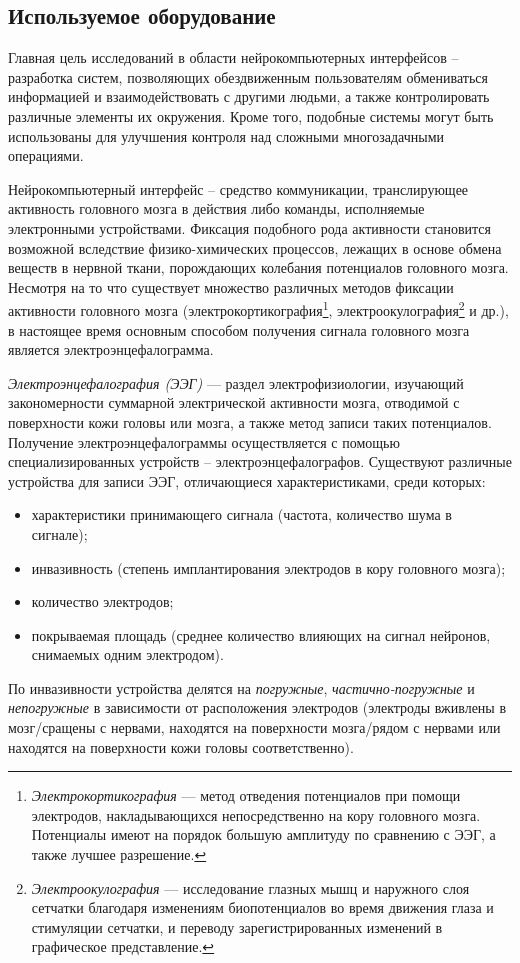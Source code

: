 \documentclass[12pt,a4paper,oneside,fleqn,leqno]{article}
\begin{document}
	\subsection{Используемое оборудование}\label{Emotiv_descr}
	\par Главная цель исследований в области нейрокомпьютерных интерфейсов -- разработка систем, позволяющих обездвиженным пользователям обмениваться информацией и взаимодействовать с другими людьми, а также контролировать различные элементы их окружения. Кроме того, подобные системы могут быть использованы для улучшения контроля над сложными многозадачными операциями.
	\par Нейрокомпьютерный интерфейс -- средство коммуникации, транслирующее активность головного мозга в действия либо команды, исполняемые электронными устройствами. Фиксация подобного рода активности становится возможной вследствие физико-химических процессов, лежащих в основе обмена веществ в нервной ткани, порождающих колебания потенциалов головного мозга. Несмотря на то что существует множество различных методов фиксации активности головного мозга (электрокортикография\footnote{{\it Электрокортикография} — метод отведения потенциалов при помощи электродов, накладывающихся непосредственно на кору головного мозга. Потенциалы имеют на порядок большую амплитуду по сравнению с ЭЭГ, а также лучшее разрешение.}, электроокулография\footnote{{\it Электроокулография} — исследование глазных мышц и наружного слоя сетчатки благодаря изменениям биопотенциалов во время движения глаза и стимуляции сетчатки, и переводу зарегистрированных изменений в графическое представление.} и др.), в настоящее время основным способом получения сигнала головного мозга является электроэнцефалограмма. 
	\par {\it Электроэнцефалография (ЭЭГ)} — раздел электрофизиологии, изучающий закономерности суммарной электрической активности мозга, отводимой с поверхности кожи головы или мозга, а также метод записи таких потенциалов. Получение электроэнцефалограммы осуществляется с помощью специализированных устройств -- электроэнцефалографов. Существуют различные устройства для записи ЭЭГ, отличающиеся характеристиками, среди которых: 
	\begin{itemize}\itemsep0pt
	\item
	характеристики принимающего сигнала (частота, количество шума в сигнале);
	\item
	инвазивность (степень имплантирования электродов в кору головного мозга);
	\item
	количество электродов;
	\item
	покрываемая площадь (среднее количество влияющих на сигнал нейронов, снимаемых одним электродом).
	\end{itemize}
	\par По инвазивности устройства делятся на {\it погружные}, {\it частично-погружные} и {\it непогружные} в зависимости от расположения электродов (электроды вживлены в мозг/сращены с нервами, находятся на поверхности мозга/рядом с нервами или находятся на поверхности кожи головы соответственно).
\end{document}
